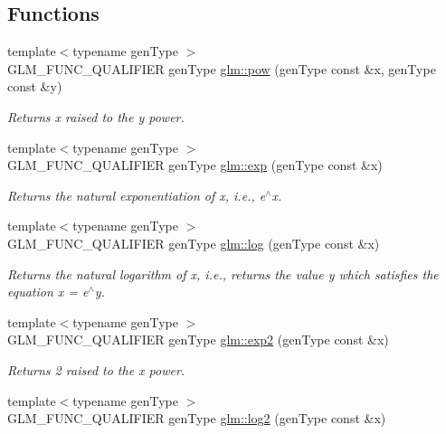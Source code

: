 \subsection*{Functions}
\begin{DoxyCompactItemize}
\item 
{\footnotesize template$<$typename gen\-Type $>$ }\\G\-L\-M\-\_\-\-F\-U\-N\-C\-\_\-\-Q\-U\-A\-L\-I\-F\-I\-E\-R gen\-Type \hyperlink{group__core__func__exponential_gac93ea301c287d87a63fa14a4c44b719b}{glm\-::pow} (gen\-Type const \&x, gen\-Type const \&y)
\begin{DoxyCompactList}\small\item\em Returns x raised to the y power. \end{DoxyCompactList}\item 
{\footnotesize template$<$typename gen\-Type $>$ }\\G\-L\-M\-\_\-\-F\-U\-N\-C\-\_\-\-Q\-U\-A\-L\-I\-F\-I\-E\-R gen\-Type \hyperlink{group__core__func__exponential_ga03903bb9395a13d554a5fbecdf67792b}{glm\-::exp} (gen\-Type const \&x)
\begin{DoxyCompactList}\small\item\em Returns the natural exponentiation of x, i.\-e., e$^\wedge$x. \end{DoxyCompactList}\item 
{\footnotesize template$<$typename gen\-Type $>$ }\\G\-L\-M\-\_\-\-F\-U\-N\-C\-\_\-\-Q\-U\-A\-L\-I\-F\-I\-E\-R gen\-Type \hyperlink{group__core__func__exponential_ga46a307f466090551e328eec42abf61bc}{glm\-::log} (gen\-Type const \&x)
\begin{DoxyCompactList}\small\item\em Returns the natural logarithm of x, i.\-e., returns the value y which satisfies the equation x = e$^\wedge$y. \end{DoxyCompactList}\item 
{\footnotesize template$<$typename gen\-Type $>$ }\\G\-L\-M\-\_\-\-F\-U\-N\-C\-\_\-\-Q\-U\-A\-L\-I\-F\-I\-E\-R gen\-Type \hyperlink{group__core__func__exponential_ga18385688b951da01cdc3a22c232e4e28}{glm\-::exp2} (gen\-Type const \&x)
\begin{DoxyCompactList}\small\item\em Returns 2 raised to the x power. \end{DoxyCompactList}\item 
{\footnotesize template$<$typename gen\-Type $>$ }\\G\-L\-M\-\_\-\-F\-U\-N\-C\-\_\-\-Q\-U\-A\-L\-I\-F\-I\-E\-R gen\-Type \hyperlink{group__core__func__exponential_gae19ff18661b33a0fe1b8edee61382f40}{glm\-::log2} (gen\-Type const \&x)

\end{DoxyCompactItemize}
